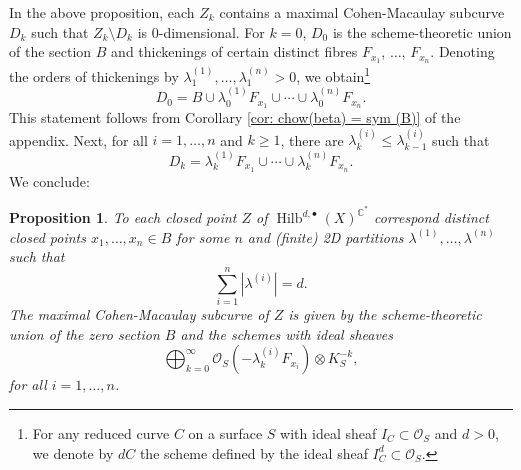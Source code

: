\documentclass{amsart}
\newtheorem{proposition}[theorem]{Proposition}
\theoremstyle{definition}
\newcommand{\CC} {\mathbb{C}}          %
\renewcommand{\O}{\mathcal{O}}
\newcommand{\Hilb}{\operatorname{Hilb}}
\begin{document}
In the above proposition, each $Z_k$ contains a maximal Cohen-Macaulay subcurve $D_k$ such that $Z_k \setminus D_k$ is 0-dimensional. For $k=0$, $D_0$ is the scheme-theoretic union of the section $B$ and thickenings of certain distinct fibres $F_{x_1}$, $\ldots$, $F_{x_n}$. Denoting the orders of thickenings by $\lambda_{1}^{(1)}, \ldots, \lambda_{1}^{(n)} > 0$, we obtain\footnote{For any reduced curve $C$ on a surface $S$ with ideal sheaf $I_C \subset \O_S$ and $d>0$, we denote by $d C$ the scheme defined by the ideal sheaf $I_{C}^{d} \subset \O_S$.}
$$
D_0 = B \cup \lambda_{0}^{(1)} F_{x_1} \cup \cdots \cup \lambda_{0}^{(n)} F_{x_n}.
$$
This statement follows from Corollary \ref{cor: chow(beta) = sym (B)} of the appendix. Next, for all $i = 1, \ldots, n$ and $k \geq 1$, there are $\lambda_{k}^{(i)} \leq \lambda_{k-1}^{(i)}$ such that
$$
D_k = \lambda_{k}^{(1)} F_{x_1} \cup \cdots \cup \lambda_{k}^{(n)} F_{x_n}.
$$
We conclude:
\begin{proposition}
To each closed point $Z$ of $\Hilb^{d,\bullet}(X)^{\CC^*}$ correspond distinct closed points $x_1, \ldots, x_n \in B$ for some $n$ and (finite) 2D partitions $\lambda^{(1)}, \ldots, \lambda^{(n)}$ such that
$$
\sum_{i=1}^{n} |\lambda^{(i)}| = d.
$$
The maximal Cohen-Macaulay subcurve of $Z$ is given by the scheme-theoretic union of the zero section $B$ and the schemes with ideal sheaves
\begin{equation} \label{CMcurve}
\bigoplus_{k=0}^{\infty} \O_{S}(-\lambda_{k}^{(i)} F_{x_i}) \otimes K_{S}^{-k},
\end{equation}
for all $i = 1, \ldots, n$.
\end{proposition}
\end{document}
